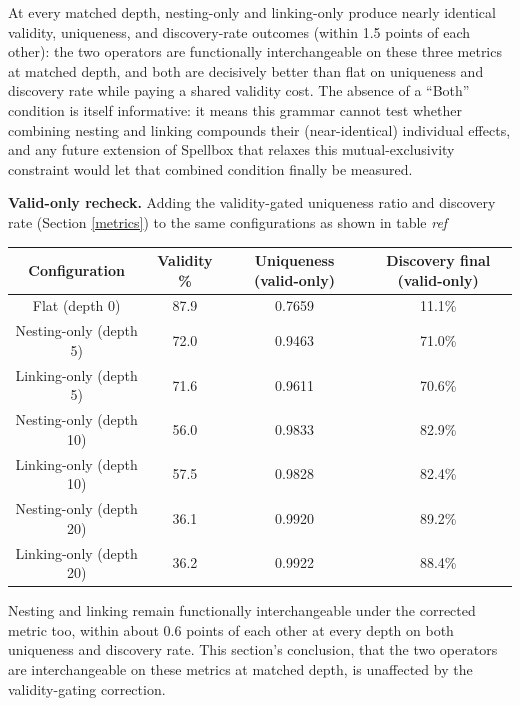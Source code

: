 \documentclass[]{article}
\begin{document}
        At every matched depth, nesting-only and linking-only produce nearly identical validity, uniqueness, and discovery-rate outcomes (within 1.5 points of each other): the two operators are functionally interchangeable on these three metrics at matched depth, and both are decisively better than flat on uniqueness and discovery rate while paying a shared validity cost. The absence of a ``Both'' condition is itself informative: it means this grammar cannot test whether combining nesting and linking compounds their (near-identical) individual effects, and any future extension of Spellbox that relaxes this mutual-exclusivity constraint would let that combined condition finally be measured.
        
        \textbf{Valid-only recheck.} Adding the validity-gated uniqueness ratio and discovery rate (Section \ref{metrics}) to the same configurations as shown in table \textit{ref}

        \begin{table}[]
            \centering
            \begin{tabularx}{\linewidth}{C C C C}
                \hline
                Configuration & Validity \% & Uniqueness (valid-only) & Discovery final (valid-only) \\
                \hline
                Flat (depth 0) & 87.9 & 0.7659 & 11.1\% \\
                Nesting-only (depth 5) & 72.0 & 0.9463 & 71.0\% \\
                Linking-only (depth 5) & 71.6 & 0.9611 & 70.6\% \\
                Nesting-only (depth 10) & 56.0 & 0.9833 & 82.9\% \\
                Linking-only (depth 10) & 57.5 & 0.9828 & 82.4\% \\
                Nesting-only (depth 20) & 36.1 & 0.9920 & 89.2\% \\
                Linking-only (depth 20) & 36.2 & 0.9922 & 88.4\% \\
                \hline
            \end{tabularx}
            \label{tab:valid-ablation}
        \end{table}
        
        Nesting and linking remain functionally interchangeable under the corrected metric too, within about 0.6 points of each other at every depth on both uniqueness and discovery rate. This section's conclusion, that the two operators are interchangeable on these metrics at matched depth, is unaffected by the validity-gating correction.
\end{document}
